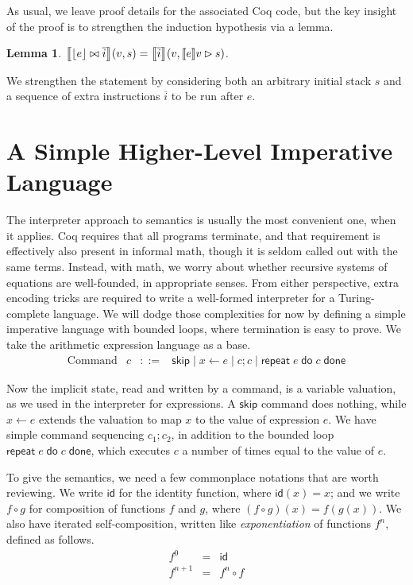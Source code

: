 \documentclass{amsbook}
\newtheorem{lemma}[theorem]{Lemma}
\theoremstyle{definition}
\theoremstyle{remark}
\numberwithin{section}{chapter}
\numberwithin{equation}{chapter}
\begin{document}
As usual, we leave proof details for the associated Coq code, but the key insight of the proof is to strengthen the induction hypothesis via a lemma.

\begin{lemma}
  ${\left \llbracket {\left \lfloor e \right \rfloor} \bowtie \overline{i} \right \rrbracket}(v, s) = {\left \llbracket \overline{i} \right \rrbracket}(v, {\left \llbracket e \right \rrbracket}v \rhd s)$.
\end{lemma}

We strengthen the statement by considering both an arbitrary initial stack $s$ and a sequence of extra instructions $\overline{i}$ to be run after $e$.

\section{A Simple Higher-Level Imperative Language}

\newcommand{\repet}[2]{\mathsf{repeat} \; #1 \; \mathsf{do} \; #2 \; \mathsf{done}}

The interpreter approach to semantics is usually the most convenient one, when it applies.
Coq requires that all programs terminate, and that requirement is effectively also present in informal math, though it is seldom called out with the same terms.
Instead, with math, we worry about whether recursive systems of equations are well-founded, in appropriate senses.
From either perspective, extra encoding tricks are required to write a well-formed interpreter for a Turing-complete language.
We will dodge those complexities for now by defining a simple imperative language with bounded loops, where termination is easy to prove.
We take the arithmetic expression language as a base.
\encoding
$$\begin{array}{rrcl}
  \textrm{Command} & c &::=& \mathsf{skip} \mid x \leftarrow e \mid c; c \mid \repet{e}{c}
\end{array}$$

Now the implicit state, read and written by a command, is a variable valuation, as we used in the interpreter for expressions.
A $\mathsf{skip}$ command does nothing, while $x \leftarrow e$ extends the valuation to map $x$ to the value of expression $e$.
We have simple command sequencing $c_1; c_2$, in addition to the bounded loop $\repet{e}{c}$, which executes $c$ a number of times equal to the value of $e$.

\newcommand{\id}[0]{\mathsf{id}}

To give the semantics, we need a few commonplace notations that are worth reviewing.
We write $\id$ for the identity function, where $\id(x) = x$; and we write $f \circ g$ for composition of functions $f$ and $g$, where $(f \circ g)(x) = f(g(x))$.
We also have iterated self-composition, written like \emph{exponentiation} of functions $f^n$, defined as follows.
\begin{eqnarray*}
  f^0 &=& \id \\
  f^{n+1} &=& f^n \circ f
\end{eqnarray*}
\end{document}
